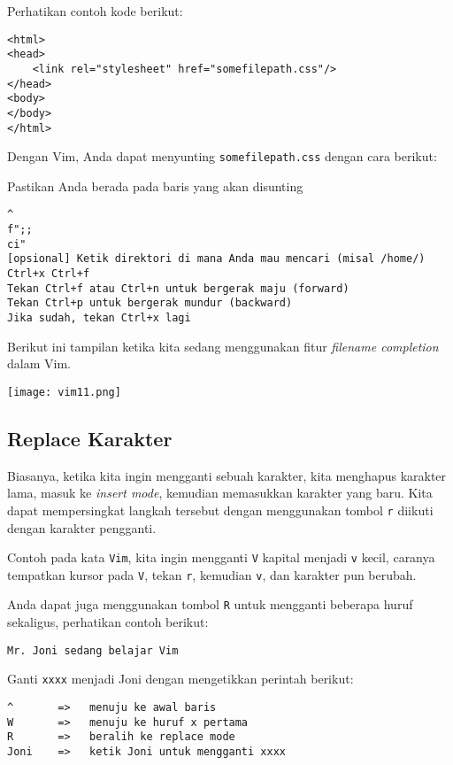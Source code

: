 \documentclass{article}
\begin{document}
Perhatikan contoh kode berikut:

\begin{verbatim}
<html>
<head>
    <link rel="stylesheet" href="somefilepath.css"/>
</head>
<body>
</body>
</html>
\end{verbatim}

Dengan Vim, Anda dapat menyunting \verb=somefilepath.css=
dengan cara berikut:

Pastikan Anda berada pada baris yang akan disunting

\begin{verbatim}
^
f";;
ci"
[opsional] Ketik direktori di mana Anda mau mencari (misal /home/)
Ctrl+x Ctrl+f
Tekan Ctrl+f atau Ctrl+n untuk bergerak maju (forward)
Tekan Ctrl+p untuk bergerak mundur (backward)
Jika sudah, tekan Ctrl+x lagi
\end{verbatim}

Berikut ini tampilan ketika kita sedang menggunakan fitur
\emph{filename completion} dalam Vim.

\vspace{12pt}

\texttt{[image: vim11.png]}

\vspace{12pt}

\subsection{Replace Karakter}
Biasanya, ketika kita ingin mengganti sebuah karakter, kita
menghapus karakter lama, masuk ke \emph{insert mode},
kemudian memasukkan karakter yang baru. Kita dapat
mempersingkat langkah tersebut dengan menggunakan tombol
\verb=r= diikuti dengan karakter pengganti.

Contoh pada kata \verb=Vim=, kita ingin mengganti \verb=V=
kapital menjadi \verb=v= kecil, caranya tempatkan kursor
pada \verb=V=, tekan \verb=r=, kemudian \verb=v=, dan
karakter pun berubah.

Anda dapat juga menggunakan tombol \verb=R= untuk mengganti
beberapa huruf sekaligus, perhatikan contoh berikut:

\begin{verbatim}
Mr. Joni sedang belajar Vim
\end{verbatim}

Ganti \verb=xxxx= menjadi Joni dengan mengetikkan perintah
berikut:

\begin{verbatim}
^       =>   menuju ke awal baris
W       =>   menuju ke huruf x pertama
R       =>   beralih ke replace mode
Joni    =>   ketik Joni untuk mengganti xxxx
\end{verbatim}
\end{document}
